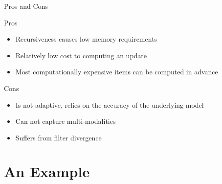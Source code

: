 \documentclass{beamer}
\begin{document}
\begin{frame}{Pros and Cons}
  \begin{box}{Pros}
    \begin{itemize}
     
    \item Recursiveness causes low memory requirements
     
    \item Relatively low cost to computing an update
     
    \item Most computationally expensive items can be computed in advance

    \end{itemize}
  \end{box}

  \begin{box}{Cons}
    \begin{itemize}

    \item  Is not adaptive, relies on the accuracy of the underlying model

    \item  Can not capture multi-modalities

    \item  Suffers from filter divergence

    \end{itemize}

  \end{box}
\end{frame}
  

\section{An Example}
\end{document}
